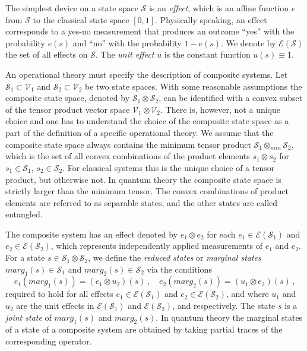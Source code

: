 \documentclass[12pt]{article}
\theoremstyle{definition}
\begin{document}
The simplest device on a state space $\mathcal{S}$ is an \emph{effect}, which is an affine function $e$ from $\mathcal{S}$ to the classical state space $[0,1]$. Physically speaking, an effect corresponds to a yes-no measurement that produces an outcome ``yes'' with the probability $e(s)$ and ``no'' with the probability $1-e(s)$. We denote by $\mathcal{E}(\mathcal{S})$ the set of all effects on $\mathcal{S}$. The \emph{unit effect} $u$ is the constant function $u(s)\equiv 1$.

An operational theory must specify the description of composite systems. 
Let $\mathcal{S}_1 \subset \mathcal{V}_1$ and $\mathcal{S}_2 \subset \mathcal{V}_2$ be two state spaces. 
With some reasonable assumptions the composite state space, denoted by $\mathcal{S}_1  \otimes \mathcal{S}_2$, 
can be identified with a convex subset of the tensor product vector space  $\mathcal{V}_1\otimes \mathcal{V}_2$. 
There is, however, not a unique choice \cite{NaPh69} and one has to understand the choice of the composite state space as a part of the definition of a specific operational theory.
We assume that the composite state space always contains the minimum tensor product $\mathcal{S}_1 \otimes_{min} \mathcal{S}_2$, which is the set of all convex combinations of the product elements $s_1\otimes s_2$ 
for $s_1\in\mathcal{S}_1$, $s_2\in\mathcal{S}_2$.
For classical systems this is the unique choice of a tensor product, but otherwise not.  
In quantum theory the composite state space is strictly larger than the minimum tensor. 
The convex combinations of product elements are referred to as separable states, and the other states are called entangled. 


The composite system has an effect denoted by $e_1 \otimes e_2$ 
for each $e_1 \in \mathcal{E}(\mathcal{S}_1)$ and 
$e_2\in \mathcal{E}(\mathcal{S}_2)$, which represents independently applied measurements of 
$e_1$ and $e_2$. 
For a state $s\in\mathcal{S}_1  \otimes \mathcal{S}_2$, we define the \emph{reduced states} or \emph{marginal states} $marg_1(s)\in\mathcal{S}_1$ and $marg_2(s)\in\mathcal{S}_2$ via the conditions
\begin{equation}
e_1( marg_1(s)) = (e_1 \otimes u_2)(s) \, , \quad e_2(marg_2(s)) = (u_1 \otimes e_2)(s) \, ,
\end{equation}
required to hold for all effects $e_1\in \mathcal{E}(\mathcal{S}_1)$ and $e_2\in\mathcal{E}(\mathcal{S}_2)$, and where $u_1$ and $u_2$ are the unit effects in $\mathcal{E}(\mathcal{S}_1)$ and $\mathcal{E}(\mathcal{S}_2)$, and respectively.
The state $s$ is a \emph{joint state} of $marg_1(s)$ and $marg_2(s)$.
In quantum theory the marginal states of a state of a composite system are obtained by taking partial traces of the corresponding operator. 
\end{document}

